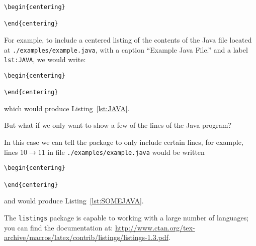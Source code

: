 \begin{verbatim}
\begin{centering}

\end{centering}
\end{verbatim}

For example, to include a centered listing of the contents of the 
Java file located at \verb|./examples/example.java|, with a 
caption ``Example Java File.'' and a label \verb|lst:JAVA|, 
we would write:

\begin{verbatim}
\begin{centering}
    
\end{centering}
\end{verbatim}

\noindent which would produce Listing~\ref{lst:JAVA}.

\begin{centering}
    
\end{centering}

\noindent
But what if we only want to show a few of the lines of the Java program?

In this case we can tell the package to only include certain lines, for
example, lines $10 \rightarrow 11$ in file \verb|./examples/example.java|
would be written

\begin{verbatim}
\begin{centering}
     
\end{centering}
\end{verbatim}

\noindent and would produce Listing~\ref{lst:SOMEJAVA}.

\begin{centering}
     
\end{centering}

The \verb|listings| package is capable to working with a large number
of languages; you can find the documentation at: 
	\url{http://www.ctan.org/tex-archive/macros/latex/contrib/listings/listings-1.3.pdf}.


